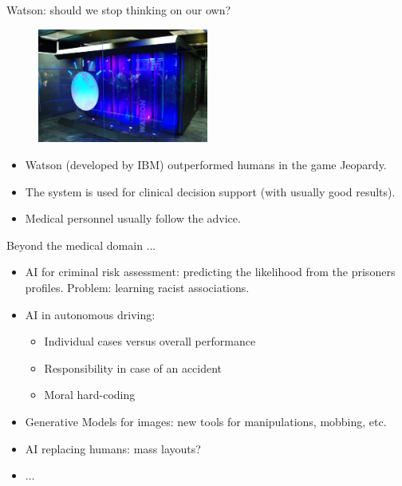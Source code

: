 \documentclass[xcolor=pdftex,dvipsnames,table]{beamer}
\begin{document}
\begin{frame}{Watson: should we stop thinking on our own?}
\begin{figure}[htb]
\includegraphics[width=0.5\textwidth]{../graphics/watson.pdf}
\end{figure}
\begin{itemize}
\item<1-> Watson (developed by IBM) outperformed humans in the game Jeopardy.
\item<2-> The system is used for clinical decision support (with usually good results).
\item<3-> Medical personnel usually follow the advice.
\end{itemize}
\end{frame}

\begin{frame}{Beyond the medical domain ... }
\begin{itemize}
\item AI for criminal risk assessment: predicting the likelihood  from the prisoners profiles. Problem: learning racist associations.
\item AI in autonomous driving:
\begin{itemize}
	\item Individual cases versus overall performance
	\item Responsibility in case of an accident
	\item Moral hard-coding
\end{itemize}
\item Generative Models for images: new tools for manipulations, mobbing, etc.
\item AI replacing humans: mass layouts?
\item $\ldots$
\end{itemize}

\end{frame}

\end{document}

